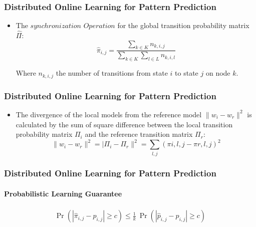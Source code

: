 \frame
{
	\frametitle{Distributed Online Learning for Pattern Prediction}
	\begin{itemize}[]

	\item<1-> The
 $synchronization$ $ Operation$ for the global transition probability matrix $\hat{\Pi}$:
 \begin{equation*}
 \label{eq:dis_pi_estim}
 \hat{\pi}_{i,j} = \frac{\sum_{k \in K} n_{k,i,j}}{\sum_{k \in K} \sum_{l \in L} n_{k,i,l}}
 \end{equation*}

Where $n_{k,i,j}$ the number of transitions from state $i$ to state $j$ on node $k$.
	
\end{itemize}
}

\frame
{
	\frametitle{Distributed Online Learning for Pattern Prediction}
	\begin{itemize}[]
		
		\item<1->The divergence of the local models from the reference model $\|w_i - w_r\|^2$ is calculated by the sum of square difference between the local transition probability matrix $\Pi_i$ and the reference transition matrix $\Pi_r$:
		\begin{equation*}
		\label{eq:dis_pi_varinace}
		\|w_i - w_r\|^2=|\Pi_i - \Pi_r\|^2=\sum_{l,j} (\pi{i,l,j} -\pi{r,l,j})^2
		\end{equation*}
		
	\end{itemize}
}


\frame
{
	\frametitle{Distributed Online Learning for Pattern Prediction}
	\framesubtitle{Probabilistic Learning Guarantee}

		
		\begin{equation*}
		\begin{aligned}
		\label{eq:guarantee}
		\Pr\left( |\hat{\pi}_{i,j} - {p}_{i,j}| \geq c \right) \leq
		\frac{1}{k}\ \Pr\left( |\hat{p}_{i,j} - {p}_{i,j}| \geq c \right)
		\end{aligned}
		\end{equation*}
		
	
}